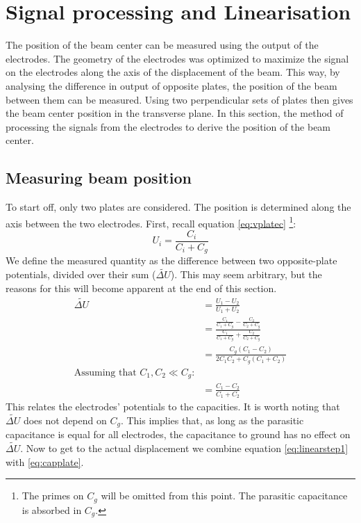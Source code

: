 \newpage
\section{Signal processing and Linearisation}
The position of the beam center can be measured using the output of the electrodes. The geometry of the electrodes was optimized to maximize the signal on the electrodes along the axis of the displacement of the beam. This way, by analysing the difference in output of opposite plates, the position of the beam between them can be measured. Using two perpendicular sets of plates then gives the beam center position in the transverse plane.
In this section, the method of processing the signals from the electrodes to derive the position of the beam center.
\subsection{Measuring beam position}
To start off, only two plates are considered. The position is determined along the axis between the two electrodes. First, recall equation \ref{eq:vplatec} \footnote{The primes on $C_g$ will be omitted from this point. The parasitic capacitance is absorbed in $C_g$.}:
\begin{equation*}
U_i=\frac{C_i}{C_i+C_g}
\end{equation*}
We define the measured quantity as the difference between two opposite-plate potentials, divided over their sum ($\widetilde{\Delta U}$). This may seem arbitrary, but the reasons for this will become apparent at the end of this section.
\begin{align}
\widetilde{\Delta U} &= \frac{U_1-U_2}{U_1+U_2} \nonumber \\
&= \frac{\frac{C_1}{C_1+C_g}-\frac{C_2}{C_2+C_g}}{\frac{C_1}{C_1+C_g}+\frac{C_2}{C_2+C_g}} \nonumber \\
&= \frac{C_g(C_1-C_2)}{2C_1C_2+C_g(C_1+C_2)} \nonumber  \\
\text{Assuming that $C_1,C_2 \ll C_g$:} \nonumber \\
&= \frac{C_1-C_2}{C_1+C_2} \label{eq:linearstep1}
\end{align}
This relates the electrodes' potentials to the capacities. It is worth noting that $\widetilde{\Delta U}$ does not depend on $C_g$. This implies that, as long as the parasitic capacitance is equal for all electrodes, the capacitance to ground has no effect on $\widetilde{\Delta U}$. Now to get to the actual displacement we combine equation \ref{eq:linearstep1} with \ref{eq:capplate}. %
